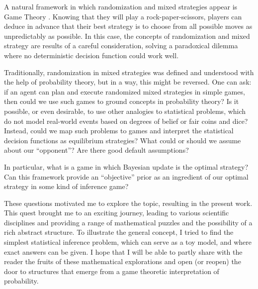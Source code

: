 \documentclass{article}
\theoremstyle{definition}
\begin{document}
A natural framework in which randomization and mixed strategies appear is Game Theory \cite{book:EssentialGameTheory,book:GameTheory,book:EvolutionaryGames,review:NeumannMorgensternGameThoery,book:GameTheoryOriginal}.
Knowing that they will play a rock-paper-scissors, players can deduce in advance that their best strategy is to choose from all possible moves as unpredictably as possible.
In this case, the concepts of randomization and mixed strategy are results of a careful consideration, solving a paradoxical dilemma where no deterministic decision function could work well.

Traditionally, randomization in mixed strategies was defined and understood with the help of probability theory, but in a way, this might be reversed.
One can ask: if an agent can plan and execute randomized mixed strategies in simple games, then could we use such games to ground concepts in probability theory?
Is it possible, or even desirable, to use other analogies to statistical problems, which do not model real-world events based on degrees of belief or fair coins and dice? Instead, could we map such problems to games and interpret the statistical decision functions as equilibrium strategies?
What could or should we assume about our ``opponent''? Are there good default assumptions?

In particular, what is a game in which Bayesian update is the optimal strategy?
Can this framework provide an ``objective'' prior as an ingredient of our optimal strategy in some kind of inference game?

These questions motivated me to explore the topic, resulting in the present work.
This quest brought me to an exciting journey, leading to various scientific disciplines and providing a range of mathematical puzzles and the possibility of a rich abstract structure.
To illustrate the general concept, I tried to find the simplest statistical inference problem, which can serve as a toy model, and where exact answers can be given.
I hope that I will be able to partly share with the reader the fruits of these mathematical explorations and open (or reopen) the door to structures that emerge from a game theoretic interpretation of probability.






\end{document}
